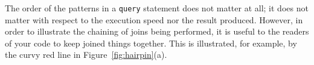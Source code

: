 \documentclass[9pt,letterpaper]{article}
\newcommand{\stt}[1]{\texttt{#1}} %
\begin{document}
The order of the patterns in a \stt{query} statement does not matter at all; it does not matter with respect to the execution speed nor the result produced.
However, in order to illustrate the chaining of joins being performed, it is useful to the readers of your code to keep joined things together.
This is illustrated, for example, by the curvy red line in Figure~\ref{fig:hairpin}(a).


\end{document}
